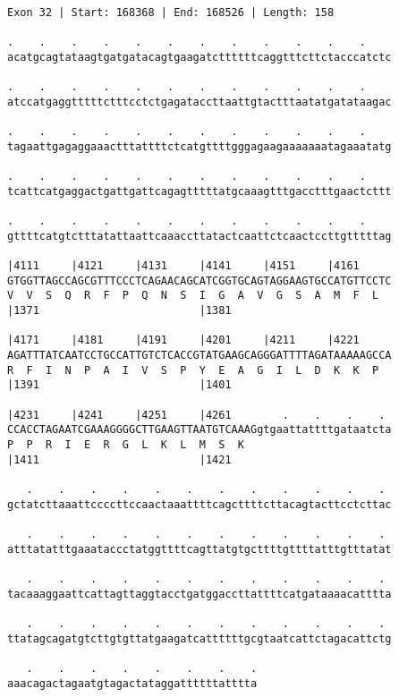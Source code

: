 \documentclass{article}
\begin{document}
\begin{Verbatim}[fontfamily=courier]
Exon 32 | Start: 168368 | End: 168526 | Length: 158

.    .    .    .    .    .    .    .    .    .    .    .    
acatgcagtataagtgatgatacagtgaagatcttttttcaggtttcttctacccatctc

.    .    .    .    .    .    .    .    .    .    .    .    
atccatgaggtttttctttcctctgagataccttaattgtactttaatatgatataagac

.    .    .    .    .    .    .    .    .    .    .    .    
tagaattgagaggaaactttattttctcatgttttgggagaagaaaaaaatagaaatatg

.    .    .    .    .    .    .    .    .    .    .    .    
tcattcatgaggactgattgattcagagtttttatgcaaagtttgacctttgaactcttt

.    .    .    .    .    .    .    .    .    .    .    .    
gttttcatgtctttatattaattcaaaccttatactcaattctcaactccttgtttttag

|4111     |4121     |4131     |4141     |4151     |4161     
GTGGTTAGCCAGCGTTTCCCTCAGAACAGCATCGGTGCAGTAGGAAGTGCCATGTTCCTC
V  V  S  Q  R  F  P  Q  N  S  I  G  A  V  G  S  A  M  F  L  
|1371                         |1381                         

|4171     |4181     |4191     |4201     |4211     |4221     
AGATTTATCAATCCTGCCATTGTCTCACCGTATGAAGCAGGGATTTTAGATAAAAAGCCA
R  F  I  N  P  A  I  V  S  P  Y  E  A  G  I  L  D  K  K  P  
|1391                         |1401                         

|4231     |4241     |4251     |4261        .    .    .    . 
CCACCTAGAATCGAAAGGGGCTTGAAGTTAATGTCAAAGgtgaattattttgataatcta
P  P  R  I  E  R  G  L  K  L  M  S  K                       
|1411                         |1421                         

   .    .    .    .    .    .    .    .    .    .    .    . 
gctatcttaaattccccttccaactaaattttcagcttttcttacagtacttcctcttac

   .    .    .    .    .    .    .    .    .    .    .    . 
atttatatttgaaataccctatggttttcagttatgtgcttttgttttatttgtttatat

   .    .    .    .    .    .    .    .    .    .    .    . 
tacaaaggaattcattagttaggtacctgatggaccttattttcatgataaaacatttta

   .    .    .    .    .    .    .    .    .    .    .    . 
ttatagcagatgtcttgtgttatgaagatcattttttgcgtaatcattctagacattctg

   .    .    .    .    .    .    .    .
aaacagactagaatgtagactataggattttttatttta
\end{Verbatim}
\end{document}
